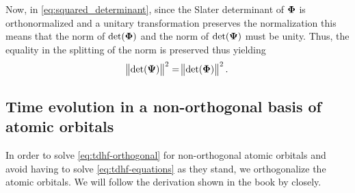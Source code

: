             Now, in \autoref{eq:squared_determinant}, since the Slater
            determinant of $\boldsymbol{\Phi}$ is orthonormalized and a unitary
            transformation preserves the normalization this means that the norm
            of $\det(\boldsymbol{\Phi})$ and the norm of $\det(\boldsymbol{\Psi})$ must be
            unity.  Thus, the equality in the splitting of the norm is preserved
            thus yielding
            \begin{gather}
                \norm{\det(\boldsymbol{\Psi})}^2 = \norm{\det(\boldsymbol{\Phi})}^2.
            \end{gather}



    \subsection{Time evolution in a non-orthogonal basis of atomic orbitals}
        In order to solve \autoref{eq:tdhf-orthogonal} for non-orthogonal
        atomic orbitals and avoid having to solve \autoref{eq:tdhf-equations}
        as they stand, we orthogonalize the atomic orbitals. We will follow the
        derivation shown in the book  by
        \citeauthor{szabo1996modern} \cite{szabo1996modern} closely.


